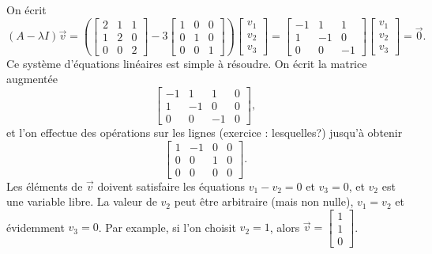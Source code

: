 \begin{example}
On écrit
\begin{equation*}
(A-\lambda I) \vec{v} = 
\left(
\begin{bmatrix}
2 & 1 & 1 \\
1 & 2 & 0 \\
0 & 0 & 2
\end{bmatrix}
- 3
\begin{bmatrix}
1 & 0 & 0 \\
0 & 1 & 0 \\
0 & 0 & 1
\end{bmatrix}
\right)
\begin{bmatrix}
v_1 \\ v_2 \\ v_3
\end{bmatrix}
=
\begin{bmatrix}
-1 & 1 & 1 \\
1 & -1 & 0 \\
0 & 0 & -1
\end{bmatrix}
\begin{bmatrix}
v_1 \\ v_2 \\ v_3
\end{bmatrix}
=
\vec{0} .
\end{equation*}
Ce système d’équations linéaires est simple à résoudre. On écrit la matrice augmentée
\begin{equation*}
\left[
\begin{array}{ccc|c}
-1 & 1 & 1 & 0 \\
1 & -1 & 0 & 0 \\
0 & 0 & -1 & 0
\end{array}
\right] ,
\end{equation*}
et l'on effectue des opérations sur les lignes (exercice : lesquelles?) jusqu’à obtenir
\begin{equation*}
\left[
\begin{array}{ccc|c}
1 & -1 & 0 & 0 \\
0 & 0 & 1 & 0 \\
0 & 0 & 0 & 0
\end{array}
\right] .
\end{equation*}
Les éléments de $\vec{v}$ doivent satisfaire les équations
$v_1 - v_2 = 0$ et $v_3 = 0$, et $v_2$ est une variable libre. La valeur de $v_2$ peut être arbitraire (mais non nulle),
$v_1 = v_2$ et évidemment $v_3 = 0$.
Par example, si l'on choisit $v_2 = 1$, alors
$\vec{v} =
\left[ \begin{smallmatrix} 1 \\ 1 \\ 0 \end{smallmatrix} \right]$.

\end{example}
